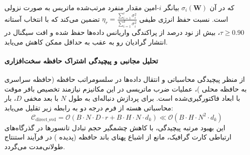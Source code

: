 که در آن $\sigma_i(\mathbf{W})$ بیانگر $i$-امین مقدار منفرد مرتب‌شده ماتریس به صورت نزولی است. نسبت حفظ انرژی طیفی $\eta_r = \frac{\sum_{i=1}^r \sigma_i^2}{\sum_{i=1}^{d} \sigma_i^2}$ تضمین می‌کند که با انتخاب آستانه $\tau \ge 0.90$، بیش از نود درصد از پراکندگی واریانس داده‌ها حفظ شده و افت سیگنال در انتشار گرادیان رو به عقب به حداقل ممکن کاهش می‌یابد.

\paragraph{تحلیل مجانبی و پیچیدگی اشتراک حافظه سخت‌افزاری}
از منظر پیچیدگی محاسباتی و انتقال داده‌ها در سلسومراتب حافظه (حافظه سراسری  به حافظه محلی )، عملیات ضرب ماتریسی در این مکانیزم نیازمند تخصیص بافر موقت با ابعاد فاکتورگیری‌شده است. برای پردازش دنباله‌ای به طول $N$ با بعد مخفی $D$، بار محاسباتی هسته از فرم درجه دو به رابطه زیر تقلیل می‌یابد:
\begin{equation}
\label{eq:complexity_direct_svd}
\mathcal{C}_{\text{direct\_svd}} = \mathcal{O}\left( B \cdot N \cdot D \cdot r + B \cdot H \cdot N \cdot d_k \right) \ll \mathcal{O}\left( B \cdot H \cdot N^2 \cdot d_k \right)
\end{equation}
این بهبود مرتبه پیچیدگی، با کاهش چشمگیر حجم تبادل تانسورها در گذرگاه‌های ارتباطی کارت گرافیک، مانع از اشباع پهنای باند حافظه (پدیده ) در فرآیند استنتاج طولانی‌مدت می‌گردد.
